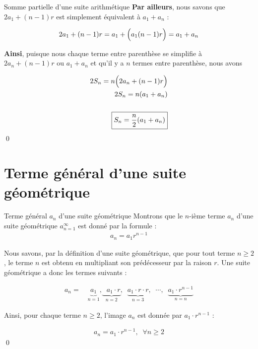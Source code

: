 \documentclass{report}
\begin{document}
\begin{Preuve}{\hypertarget{Somme des n premiers termes arithmétique}{Somme partielle d'une suite arithmétique}}{}
        \textbf{Par ailleurs}, nous savons que $2a_1 + (n - 1)r$ est simplement 
        équivalent à $a_1 + a_n$ : 

        \begin{align*}
            2a_1 + (n -1)r = a_1 + \Bigl( a_1 (n - 1)r \Bigr) = a_1 + a_n
        \end{align*}

        \textbf{Ainsi}, puisque nous chaque terme entre parenthèse se simplifie 
        à $2a_n + (n -1)r$ ou $a_1 + a_n$ 
        et qu'il y a $n$ termes entre parenthèse, nous avons 

        \begin{align*}
            2S_n = n\Bigl(2a_n + (n -1)r \Bigr) \\ 
            2S_n = n(a_1 + a_n) \\\\ 
            \boxed{
            S_n = \dfrac{n}{2} (a_1 + a_n)}
        \end{align*}
        \qed
    \end{Preuve}    

    \section{Terme général d'une suite \textcolor{myb}{\textbf{géométrique}}}
    \begin{Preuve}{Terme général $a_n$ d'une suite géométrique}{}
        Montrons que le $n$-ième terme $a_n$ d'une suite géométrique 
        $a_{n = 1}^{\infty}$ est donné par la formule : 
        \begin{align*}
            a_n = a_1r^{n-1}
        \end{align*}

        Nous savons, par la définition d'une suite géométrique, que pour tout terme 
        $n \geq 2$, le terme $n$ est obtenu en multipliant son prédécesseur par la 
        raison $r$. Une suite géométrique a donc les termes suivants : 
        
        \begin{align*}
        a_n = \quad 
        \underbrace{a_1}_{n = 1}, 
        \underbrace{\;\; a_1 \cdot r}_{n = 2}, \;\; 
        \underbrace{a_1 \cdot r \cdot r}_{n = 3}, \;\; 
        \cdots, \;\; 
        \underbrace{a_1 \cdot r^{n-1}}_{n = n}
        \end{align*}

        Ainsi, pour chaque terme $n \geq 2$, l'image $a_n$ est donnée par 
        $a_1 \cdot r^{n -1}$ : 

        \begin{align*}
            \boxed{
            a_n = a_1 \cdot r^{n - 1}, \;\; \forall n \geq 2
        }
        \end{align*} 
        \qed
    \end{Preuve}
\end{document}
